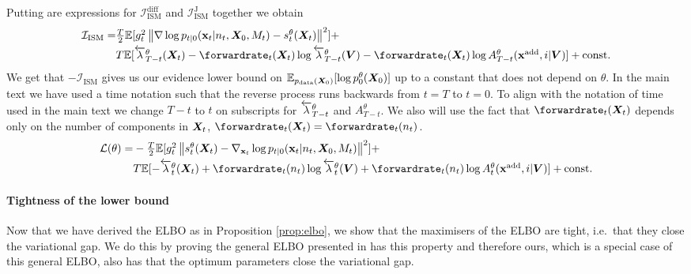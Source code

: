 Putting are expressions for $\mathcal{I}_{\text{ISM}}^{\text{diff}}$ and $\mathcal{I}_{\text{ISM}}^{\text{J}}$ together we obtain
\begin{align}
    \mathcal{I}_{\text{ISM}} = &\textstyle \frac{T}{2} \mathbb{E} [g_t^2 \norm{\nabla \log p_{t|0}(\rvx_t | n_t, \mX_0, M_t) - s_t^\theta(\mX_t)}^2 ] + \\
    &\textstyle T\mathbb{E} [ \backwardrate_{T-t}^\theta(\mX_t) - \forwardrate_t(\mX_t) \log \backwardrate_{T-t}^\theta(\mV) - \forwardrate_t(\mX_t) \log A_{T-t}^\theta(\xadd, i | \mV) ] + \text{const} . 
\end{align}
We get that $-\mathcal{I}_{\text{ISM}}$ gives us our evidence lower bound on
$\mathbb{E}_{p_{\rm{data}}({\bm{X}}_0)} [ \log p_0^\theta({\bm{X}}_0) ]$ up to a constant that does
not depend on $\theta$. In the main text we have used a time notation such that
the reverse process runs backwards from $t=T$ to $t=0$. To align with the
notation of time used in the main text we change $T-t$ to $t$ on subscripts for
$\overleftarrow{\lambda}_{T-t}^\theta$ and $A_{T-t}^\theta$. We also will use the fact
that $\forwardrate_t(\mX_t)$ depends only on the number of components in ${\bm{X}}_t$,
$\forwardrate_t(\mX_t) = \forwardrate_t(n_t)$.
\begin{align}
    \mathcal{L}(\theta) = &\textstyle  -\frac{T}{2} \mathbb{E} [g_t^2 \norm{ s_t^\theta(\mX_t) - \nabla_{\rvx_t} \log p_{t|0}(\rvx_t | n_t, \mX_0, M_t)}^2 ] + \\
    &\textstyle T\mathbb{E} [ - \backwardrate_{t}^\theta(\mX_t) + \forwardrate_t(n_t) \log \backwardrate_{t}^\theta(\mV) + \forwardrate_t(n_t) \log A_{t}^\theta(\xadd, i | \mV) ] + \text{const} . 
\end{align}




\paragraph{Tightness of the lower bound}
\label{sec:tddm-tightness-}
Now that we have derived the ELBO as in Proposition \ref{prop:elbo}, we show that the maximisers of the ELBO are tight, i.e.~that they close the variational
gap. We do this by proving the general ELBO presented in \citet{benton2022denoising} has this property and therefore ours, which is a special case of this general ELBO, also has that the optimum parameters close the variational gap.


